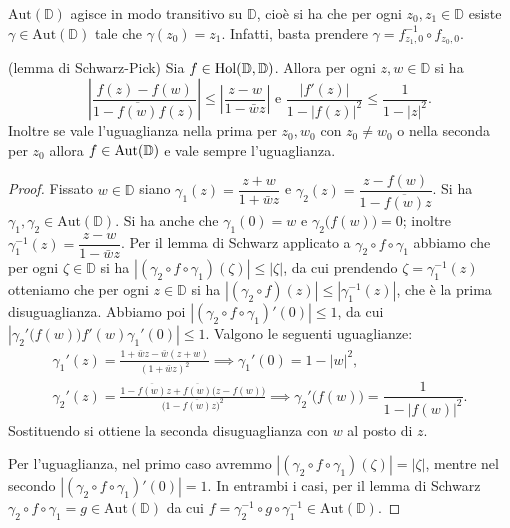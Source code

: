 \begin{oss} \label{transi}
  $\text{Aut}(\mathbb{D})$ agisce in modo transitivo su $\mathbb{D}$, cioè si ha che per ogni $z_0, z_1 \in \mathbb{D}$ esiste $\gamma \in \text{Aut}(\mathbb{D})$ tale che $\gamma(z_0)=z_1$. Infatti, basta prendere $\gamma=f_{z_1, 0}^{-1} \circ f_{z_0, 0}$.
\end{oss}

\begin{lm} \label{SP}
  (lemma di Schwarz-Pick) Sia $f \in \text{\normalfont{Hol}}(\mathbb{D},\mathbb{D})$.
  Allora per ogni $z, w \in \mathbb{D}$ si ha
  $$\left|\frac{f(z)-f(w)}{1-\overline{f(w)}f(z)}\right| \le \left|\frac{z-w}{1-\bar{w}z}\right| \text{ e } \frac{|f'(z)|}{1-|f(z)|^2} \le \frac{1}{1-|z|^2}.$$
  Inoltre se vale l'uguaglianza nella prima per $z_0, w_0$ con $z_0 \not=w_0$ o nella seconda per $z_0$ allora $f \in \text{\normalfont{Aut}}(\mathbb{D})$ e vale sempre l'uguaglianza.
\end{lm}

\begin{proof}
  Fissato $w \in \mathbb{D}$ siano $\gamma_1(z)=\dfrac{z+w}{1+\bar{w}z}$ e $\gamma_2(z)=\dfrac{z-f(w)}{1-\overline{f(w)}z}$. Si ha $\gamma_1, \gamma_2 \in \text{Aut}(\mathbb{D})$. Si ha anche che $\gamma_1(0)=w$ e $\gamma_2\bigl(f(w)\bigr)=0$; inoltre $\gamma_1^{-1}(z)=\dfrac{z-w}{1-\bar{w}z}$.
  Per il lemma di Schwarz applicato a $\gamma_2 \circ f \circ \gamma_1$ abbiamo che per ogni $\zeta \in \mathbb{D}$ si ha $|(\gamma_2 \circ f \circ \gamma_1)(\zeta)| \le |\zeta|$, da cui prendendo $\zeta=\gamma_1^{-1}(z)$ otteniamo che per ogni $z \in \mathbb{D}$ si ha $|(\gamma_2 \circ f)(z)| \le |\gamma_1^{-1}(z)|$, che è la prima disuguaglianza.
  Abbiamo poi $|(\gamma_2 \circ f \circ \gamma_1)'(0)| \le 1$, da cui $|\gamma_2'\bigl(f(w)\bigr)f'(w)\gamma_1'(0)| \le 1$. Valgono le seguenti uguaglianze:
  \begin{gather*}
    \gamma_1'(z)=\frac{1+\bar{w}z-\bar{w}(z+w)}{(1+\bar{w}z)^2} \implies \gamma_1'(0)=1-|w|^2, \\
    \gamma_2'(z)=\frac{1-\overline{f(w)}z+\overline{f(w)}\bigl(z-f(w)\bigr)}{\bigl(1-\overline{f(w)}z\bigr)^2} \implies \gamma_2'\bigl(f(w)\bigr)=\dfrac{1}{1-|f(w)|^2}.
  \end{gather*}
  Sostituendo si ottiene la seconda disuguaglianza con $w$ al posto di $z$.

  Per l'uguaglianza, nel primo caso avremmo $|(\gamma_2 \circ f \circ \gamma_1)(\zeta)|=|\zeta|$, mentre nel secondo $|(\gamma_2\circ f\circ\gamma_1)'(0)|=1$. In entrambi i casi, per il lemma di Schwarz $\gamma_2 \circ f \circ \gamma_1=g \in \text{Aut}(\mathbb{D})$ da cui $f=\gamma_2^{-1}\circ g \circ \gamma_1^{-1} \in \text{Aut}(\mathbb{D})$.
\end{proof}

